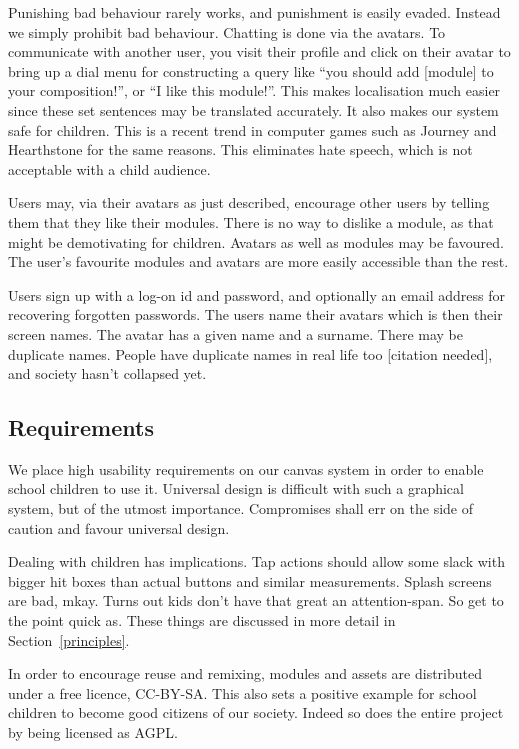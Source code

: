 Punishing bad behaviour rarely works, and punishment is easily evaded. Instead 
we simply prohibit bad behaviour. Chatting is done via the avatars. To 
communicate with another user, you visit their profile and click on their 
avatar to bring up a dial menu for constructing a query like ``you should add 
[module] to your composition!'', or ``I like this module!''. This makes 
localisation much easier since these set sentences may be translated 
accurately. It also makes our system safe for 
children\cite{sadler2012virtual}. This is a recent trend in computer games 
such as Journey and Hearthstone for the same reasons. This eliminates hate 
speech\cite{hearthstone}, which is not acceptable with a child audience.

Users may, via their avatars as just described, encourage other users by 
telling them that they like their modules. There is no way to dislike a 
module, as that might be demotivating for children. Avatars as well as modules 
may be favoured. The user's favourite modules and avatars are more easily 
accessible than the rest.

Users sign up with a log-on id and password, and optionally an email address 
for recovering forgotten passwords. The users name their avatars which is then 
their screen names. The avatar has a given name and a surname. There may be 
duplicate names. People have duplicate names in real life too [citation 
needed], and society hasn't collapsed yet.

\subsection{Requirements}
We place high usability requirements on our canvas system in order to enable
school children to use it. Universal design is difficult with such a graphical 
system, but of the utmost importance. Compromises shall err on the side of 
caution and favour universal design.

Dealing with children has implications. Tap actions should allow some slack 
with bigger hit boxes than actual buttons and similar measurements. Splash 
screens are bad, mkay. Turns out kids don't have that great an attention-span. 
So get to the point quick as. These things are discussed in more detail in 
Section~\ref{principles}.

In order to encourage reuse and remixing, modules and assets are distributed 
under a free licence, CC-BY-SA\@. This also sets a positive example for school 
children to become good citizens of our society. Indeed so does the entire 
project by being licensed as AGPL\@\cite{educational}.

